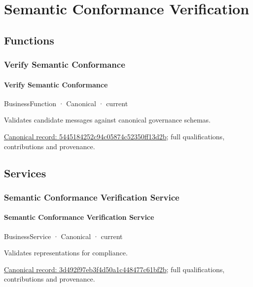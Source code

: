 \section{Semantic Conformance Verification}

\subsection{Functions}

\subsubsection{Verify Semantic Conformance}

\paragraph{Verify Semantic Conformance}

\label{element:5445184252c94c05874c52350ff13d2b}
{\small BusinessFunction · Canonical · current}\par

Validates candidate messages against canonical governance schemas.


{\footnotesize \href{../../../../continuum/business/business-function/5445184252c94c05874c52350ff13d2b.md}{Canonical record: 5445184252c94c05874c52350ff13d2b}; full qualifications, contributions and provenance.}\par
\subsection{Services}

\subsubsection{Semantic Conformance Verification Service}

\paragraph{Semantic Conformance Verification Service}

\label{element:3d492f97eb3f4d50a1c448477c61bf2b}
{\small BusinessService · Canonical · current}\par

Validates representations for compliance.


{\footnotesize \href{../../../../continuum/business/business-service/3d492f97eb3f4d50a1c448477c61bf2b.md}{Canonical record: 3d492f97eb3f4d50a1c448477c61bf2b}; full qualifications, contributions and provenance.}\par
